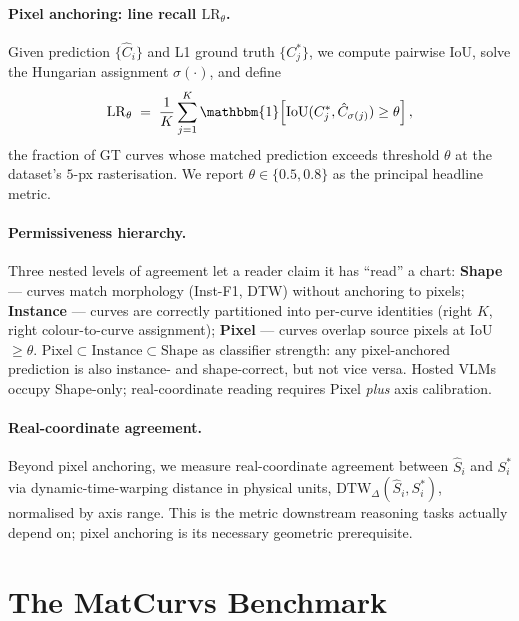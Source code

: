 \documentclass{article}
\begin{document}
\paragraph{Pixel anchoring: line recall $\mathrm{LR}_\theta$.}
Given prediction $\{\hat{C}_{i}\}$ and L1 ground truth
$\{C^{*}_{j}\}$, we compute pairwise IoU, solve the Hungarian
assignment $\sigma(\cdot)$, and define
\begin{equation}
  \mathrm{LR}_{\theta} \;=\;
  \frac{1}{K}\sum_{j=1}^{K}
  \mathbbm{1}\!\left[\mathrm{IoU}(C^{*}_{j},\hat{C}_{\sigma(j)})\ge\theta\right],
  \label{eq:lr}
\end{equation}
the fraction of GT curves whose matched prediction exceeds threshold
$\theta$ at the dataset's $5$-px rasterisation. We report $\theta\in
\{0.5, 0.8\}$ as the principal headline metric.

\paragraph{Permissiveness hierarchy.}
Three nested levels of agreement let a reader claim it has ``read''
a chart: \textbf{Shape} --- curves match morphology (Inst-F1, DTW)
without anchoring to pixels; \textbf{Instance} --- curves are
correctly partitioned into per-curve identities (right $K$, right
colour-to-curve assignment); \textbf{Pixel} --- curves overlap
source pixels at IoU${\ge}\theta$.
$\text{Pixel}\!\subset\!\text{Instance}\!\subset\!\text{Shape}$ as
classifier strength: any pixel-anchored prediction is also instance-
and shape-correct, but not vice versa. Hosted VLMs occupy
Shape-only; real-coordinate reading requires Pixel \emph{plus} axis
calibration.

\paragraph{Real-coordinate agreement.}
Beyond pixel anchoring, we measure real-coordinate agreement
between $\hat{S}_{i}$ and $S^{*}_{i}$ via dynamic-time-warping
distance in physical units,
$\mathrm{DTW}_\Delta(\hat{S}_{i},S^{*}_{i})$, normalised by axis
range. This is the metric downstream reasoning tasks actually depend
on; pixel anchoring is its necessary geometric prerequisite.

\section{The MatCurvs Benchmark}
\label{sec:bench}
\end{document}
